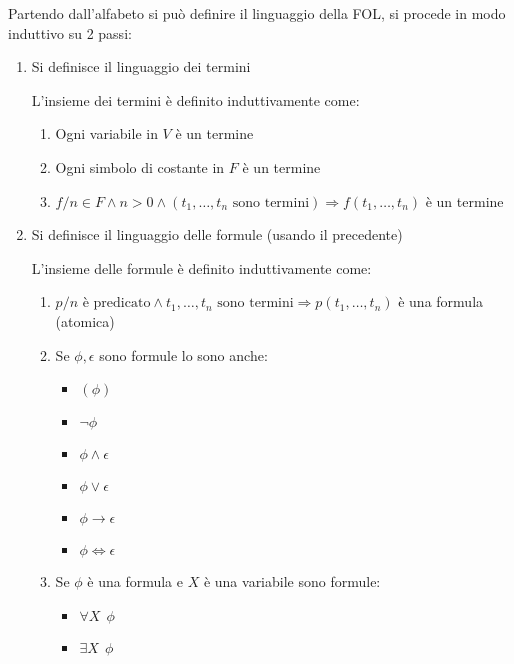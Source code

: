 \documentclass{article}
\begin{document}
\noindent Partendo dall'alfabeto si può definire il linguaggio della FOL, si procede in modo induttivo su 2 passi:
\begin{enumerate}
    \item Si definisce il linguaggio dei termini

        \vspace{5pt}

        L'insieme dei termini è definito induttivamente come:
            \begin{enumerate}
                \item Ogni variabile in $V$ è un termine
                \item Ogni simbolo di costante in $F$ è un termine
                \item $f/n\in F\wedge n>0\wedge (t_1,\ldots,t_n\text{ sono termini})\Rightarrow f(t_1,\ldots,t_n)$ è un termine
            \end{enumerate}

    \newpage
        
    \item Si definisce il linguaggio delle formule (usando il precedente)

        \vspace{5pt}

        L'insieme delle formule è definito induttivamente come:
            \begin{enumerate}
                \item $p/n\text{ è predicato}\wedge t_1,\ldots,t_n\text{ sono termini}\Rightarrow p(t_1,\ldots,t_n)$ è una formula (atomica)
                \item Se $\phi,\epsilon$ sono formule lo sono anche:
                    \begin{itemize}
                        \item $(\phi)$
                        \item $\neg\phi$
                        \item $\phi\wedge\epsilon$
                        \item $\phi\vee\epsilon$
                        \item $\phi\rightarrow\epsilon$
                        \item $\phi\iff\epsilon$
                    \end{itemize}
                \item Se $\phi$ è una formula e $X$ è una variabile sono formule:
                    \begin{itemize}
                        \item $\forall X\ \ \phi$
                        \item $\exists X\ \ \phi$
                    \end{itemize}
            \end{enumerate}
\end{enumerate}
\end{document}
